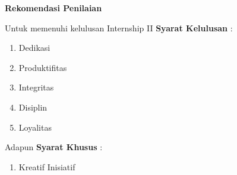 
\begin{center}
  \textbf{Rekomendasi Penilaian}
\end{center}
Untuk memenuhi kelulusan Internship II \textbf{Syarat Kelulusan} :
\begin{enumerate}
  \item Dedikasi
  \item Produktifitas
  \item Integritas
  \item Disiplin
  \item Loyalitas
\end{enumerate}
Adapun \textbf{Syarat Khusus} :
\begin{enumerate}
  \item Kreatif Inisiatif
\end{enumerate}

